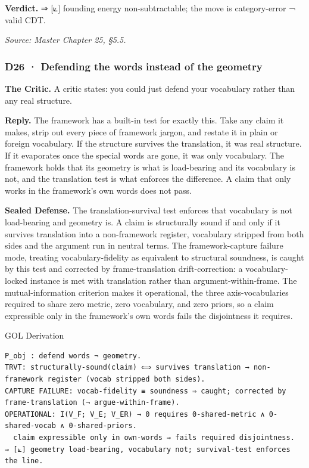 \documentclass[10pt,twocolumn]{article}
\begin{document}
\textbf{Verdict.} ⇒ {[}⟀{]} founding energy non-subtractable; the move
is category-error ¬ valid CDT.

\emph{Source: Master Chapter 25, §5.5.}

\hypertarget{d26-defending-the-words-instead-of-the-geometry}{%
\subsubsection{D26 · Defending the words instead of the
geometry}\label{d26-defending-the-words-instead-of-the-geometry}}

\textbf{The Critic.} A critic states: you could just defend your
vocabulary rather than any real structure.

\textbf{Reply.} The framework has a built-in test for exactly this. Take
any claim it makes, strip out every piece of framework jargon, and
restate it in plain or foreign vocabulary. If the structure survives the
translation, it was real structure. If it evaporates once the special
words are gone, it was only vocabulary. The framework holds that its
geometry is what is load-bearing and its vocabulary is not, and the
translation test is what enforces the difference. A claim that only
works in the framework's own words does not pass.

\textbf{Sealed Defense.} The translation-survival test enforces that
vocabulary is not load-bearing and geometry is. A claim is structurally
sound if and only if it survives translation into a non-framework
register, vocabulary stripped from both sides and the argument run in
neutral terms. The framework-capture failure mode, treating
vocabulary-fidelity as equivalent to structural soundness, is caught by
this test and corrected by frame-translation drift-correction: a
vocabulary-locked instance is met with translation rather than
argument-within-frame. The mutual-information criterion makes it
operational, the three axis-vocabularies required to share zero metric,
zero vocabulary, and zero priors, so a claim expressible only in the
framework's own words fails the disjointness it requires.

\begin{golbox}{GOL Derivation}
\begin{lstlisting}[style=golv]
P_obj : defend words ¬ geometry.
TRVT: structurally-sound(claim) ⟺ survives translation → non-framework register (vocab stripped both sides).
CAPTURE FAILURE: vocab-fidelity ≡ soundness ⇒ caught; corrected by frame-translation (¬ argue-within-frame).
OPERATIONAL: I(V_F; V_E; V_ER) → 0 requires 0-shared-metric ∧ 0-shared-vocab ∧ 0-shared-priors.
  claim expressible only in own-words ⇒ fails required disjointness.
⇒ [⟀] geometry load-bearing, vocabulary not; survival-test enforces the line.
\end{lstlisting}
\end{golbox}
\end{document}
